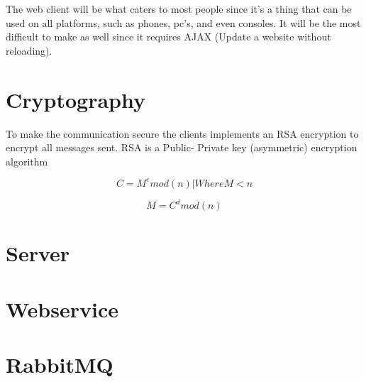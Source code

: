 The web client will be what caters to most people since it's a thing that can be used on all platforms, such as phones, pc's, and even consoles. It will be the most difficult to make as well since it requires AJAX (Update a website without reloading).

\section{Cryptography}

To make the communication secure the clients implements an RSA encryption to encrypt all messages sent. RSA is a Public- Private key (asymmetric) encryption algorithm

\begin{equation}
C=M^e mod(n) | Where M < n
\end{equation}

\begin{equation}
M=C^d mod(n)
\end{equation}

\section{Server}

\section{Webservice}

\section{RabbitMQ}